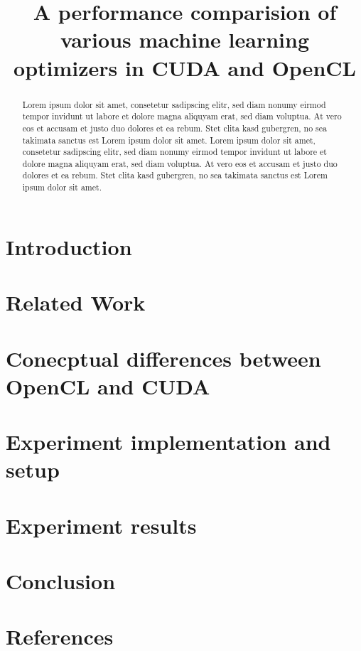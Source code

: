 \documentclass[onecolumn,12pt]{IEEEtran}
\begin{document}
	

\title{A performance comparision of various machine learning optimizers in CUDA and OpenCL }
\maketitle
\begin{abstract}
	\normalsize
	Lorem ipsum dolor sit amet, consetetur sadipscing elitr, sed diam nonumy eirmod tempor invidunt ut labore et dolore magna aliquyam erat, sed diam voluptua. At vero eos et accusam et justo duo dolores et ea rebum. Stet clita kasd gubergren, no sea takimata sanctus est Lorem ipsum dolor sit amet. Lorem ipsum dolor sit amet, consetetur sadipscing elitr, sed diam nonumy eirmod tempor invidunt ut labore et dolore magna aliquyam erat, sed diam voluptua. At vero eos et accusam et justo duo dolores et ea rebum. Stet clita kasd gubergren, no sea takimata sanctus est Lorem ipsum dolor sit amet.
\end{abstract}

\pagebreak 



\section{Introduction}


\section{Related Work}


\section{Conecptual differences between OpenCL and CUDA}


\pagebreak
\section{Experiment implementation and setup}


\section{Experiment results}

\section{Conclusion}

\section{References}

\end{document}
